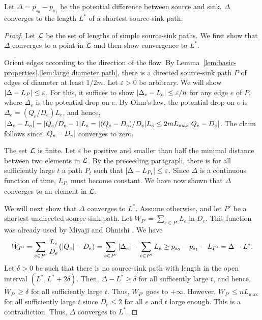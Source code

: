 \documentclass[11pt,a4paper]{article}
\renewcommand{\source}{\ensuremath{s_0}}
\renewcommand{\sink}{\ensuremath{s_1}}
\newcommand{\Lmax}{\ensuremath{L_{\mathrm{max}}}}
\begin{document}
\begin{lemma}\label{lem:convergence of Delta} Let $\Delta = p_{\source} -
p_{\sink}$ be the potential difference between source and sink. $\Delta$
converges to the length $L^*$ of a shortest source-sink path.\end{lemma}
\begin{proof} Let $\cal L$ be the set of lengths of simple source-sink
paths. We first show that $\Delta$ converges to a point in $\cal L$ and then
show convergence to $L^*$.

Orient edges according to the direction of the flow. 
By Lemma~\ref{lem:basic-properties}.\ref{lem:large diameter path}, there is a directed 
source-sink path $P$ of edges of diameter at
least $1/2m$. Let $\varepsilon > 0$ be arbitrary. We will show $| \Delta -
L_P | \le \varepsilon$. For this, it suffices to show $| \Delta_e - L_e |
\le \varepsilon/n$ for any edge $e$ of $P$, where $\Delta_e$ is the potential
drop on $e$. By Ohm's law, the potential drop on $e$ is $\Delta_e = (Q_e/D_e)
L_e$, and hence, $\abs{\Delta_e - L_e} = \abs{Q_e/D_e - 1} L_e = \abs{(Q_e -
D_e)/D_e} L_e \le 2m \Lmax \abs{Q_e - D_e}$. The claim follows since $| Q_e
- D_e |$ converges to zero.

The set $\cal L$ is finite. Let
$\varepsilon$ be positive and smaller than half the minimal distance between two elements in
$\cal L$. By the preceeding paragraph, there is for all sufficiently large $t$
a path $P_t$ such that 
$| \Delta - L_{P_t} | \le \varepsilon$. Since $\Delta$ is a continuous
function of time, $L_{P_t}$ must become constant. We have now shown that
$\Delta$ converges to an element in $\cal L$. 

We will next show that $\Delta$ converges to $L^*$. 
Assume otherwise, and let $P'$ be a shortest undirected
source-sink path. Let $W_{P'} = \sum_{e \in P'} L_e \ln D_e$. This function was
already used by Miyaji and Ohnishi \cite{Miyaji-Ohnishi}. We have
\[ 
 \dot{W}_{P'} = \sum_{e \in P'} \frac{L_e}{D_e} (| Q_e | - D_e)  = \sum_{e
\in P'} | \Delta_e | - \sum_{e \in P'} L_e \ge p_{s_0}-p_{s_1} - L_{P'} =
\Delta - L^*.\]
Let $\delta > 0$ be such that there is no source-sink path with length in the
open interval $(L^*, L^* + 2 \delta)$. Then, $\Delta - L^*\ge \delta$
for all sufficently large $t$, and hence, $\dot{W}_{P'} \ge \delta$ for all
sufficiently large $t$. Thus, $W_{P'}$ goes to $+\infty$. However, $W_{P'} \le
n \Lmax$ for all sufficiently large $t$ since $D_e \le 2$ for all $e$ and $t$
large enough. This is a contradiction. Thus, $\Delta$ converges to $L^*$.
\end{proof}
\end{document}
